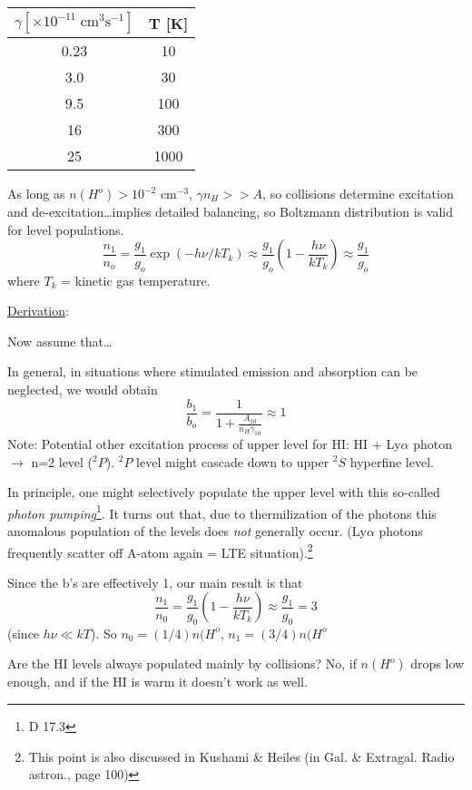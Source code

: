 \documentclass[12pt]{article}
\newcommand{\mar}[1]{\hspace{0pt}\marginpar{-\textcolor{black}{#1}-}}
\begin{document}
\begin{center}
    \begin{tabular}{c c}
        $\gamma [\times10^{-11}\;\mathrm{cm}^{3}\mathrm{s}^{-1}]$ & T [K]\\
        \hline
        0.23 & 10\\
        3.0 & 30\\
        9.5 & 100\\
        16 & 300\\
        25 & 1000
    \end{tabular}
\end{center}
As long as $n(H^{o}) > 10^{-2}$ cm$^{-3}$, $\gamma n_{H} >> A$, so
collisions determine excitation and de-excitation\ldots implies
detailed balancing, so Boltzmann distribution is valid for level
populations.
\[
    \frac{n_{1}}{n_{o}} = \frac{g_{1}}{g_{o}}\exp(-h\nu/kT_{k})
    \approx \frac{g_{1}}{g_{o}}(1-\frac{h\nu}{kT_{k}}) \approx \frac{g_{1}}{g_{o}}
    \]
where $T_{k}$ = kinetic gas temperature.


\underline{Derivation}:\mar{35}

Now\mar{36} assume that\ldots

In general, in situations where stimulated emission and absorption can
be neglected, we would obtain
\[
    \frac{b_{1}}{b_{o}} = \frac{1}{1 + \frac{A_{10}}{n_{H}\gamma_{10}}}
    \approx 1
    \]
Note: Potential other excitation process of upper level for HI:
HI + Ly$\alpha$ photon $\rightarrow$ n=2 level ($^{2}P$). $^{2}P$ level might cascade
down to upper $^{2}S$ hyperfine level.

In principle, one might selectively populate the upper level with this
so-called \textit{photon pumping}\footnote{D 17.3}.
It turns out that, due to thermilization of the photons this anomalous
population of the levels does \emph{not} generally occur. (Ly$\alpha$ photons
frequently scatter off A-atom again = LTE situation).\footnote{
    This point is also discussed in Kushami \& Heiles (in Gal. \&
    Extragal. Radio astron., page 100)}

\mar{37}Since the b's are effectively 1, our \textcolor{bred}{main result}
is that
\[
    \frac{n_{1}}{n_{0}}
    = \frac{g_{1}}{g_{0}} \left( 1 - \frac{h\nu}{kT_{k}} \right)
    \approx \frac{g_{1}}{g_{0}} = 3
    \]
(since $h\nu \ll kT$). So $n_{0} = (1/4)n(H^{o}$, $n_{1} = (3/4)n(H^{o}$

Are the HI levels always populated mainly by collisions? No, if $n(H^{o})$ drops
low enough, and if the HI is warm it doesn't work as well.
\end{document}
